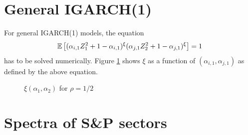 \documentclass{article}
\begin{document}
\section{General IGARCH(1)}
For general IGARCH(1) models, the equation
\begin{equation*}
  \mathbb{E} \left[
    (
    \alpha_{i,1} Z_1^2 + 1 - \alpha_{i,1}
    )^\xi
    (
    \alpha_{j,1} Z_2^2 + 1 - \alpha_{j,1}
    )^\xi\right] = 1
\end{equation*}
has to be solved numerically. Figure \ref{fig:xi_rho0.5} shows $\xi$
as a function of $(\alpha_{i,1}, \alpha_{j,1})$ as defined by the
above equation.
\begin{figure}[htb!]
  \centering
  \caption{$\xi(\alpha_1, \alpha_2)$ for $\rho = 1/2$}
  \label{fig:xi_rho0.5}
\end{figure}

\section{Spectra of S\&P sectors}
\end{document}
